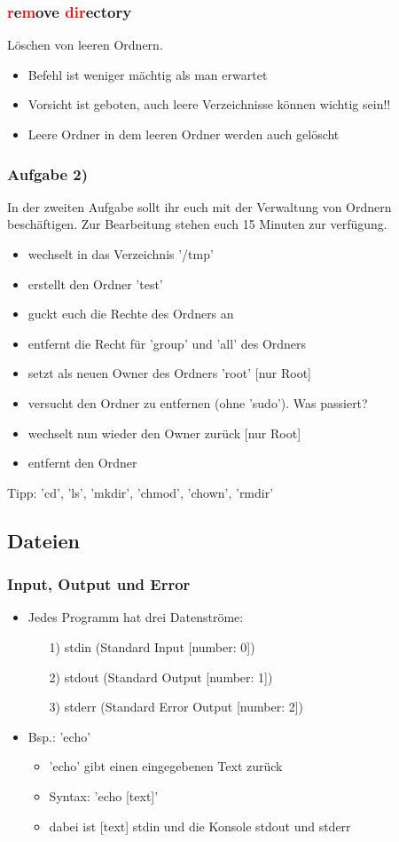 \documentclass[12pt,utf8, handout]{beamer}
\begin{document}
\begin{frame}
\frametitle{\textcolor{red}{r}e\textcolor{red}{m}ove \textcolor{red}{dir}ectory}
Löschen von leeren Ordnern.
\begin{itemize}
	\item Befehl ist weniger mächtig als man erwartet
	\item Vorsicht ist geboten, auch leere Verzeichnisse können wichtig sein!!
	\item Leere Ordner in dem leeren Ordner werden auch gelöscht
\end{itemize}
\end{frame}

\begin{frame}
\frametitle{Aufgabe 2)}
In der zweiten Aufgabe sollt ihr euch mit der Verwaltung von Ordnern beschäftigen. Zur Bearbeitung stehen euch 15 Minuten zur verfügung.
{\footnotesize
\begin{itemize}
	\item wechselt in das Verzeichnis '/tmp'
	\item erstellt den Ordner 'test'
	\item guckt euch die Rechte des Ordners an
	\item entfernt die Recht für 'group' und 'all' des Ordners
	\item setzt als neuen Owner des Ordners 'root' [nur Root]
	\item versucht den Ordner zu entfernen (ohne 'sudo'). Was passiert?
	\item wechselt nun wieder den Owner zurück [nur Root]
	\item entfernt den Ordner
\end{itemize}
}
{\scriptsize Tipp: 'cd', 'ls', 'mkdir', 'chmod', 'chown', 'rmdir'}
\end{frame}

\subsection{Dateien}
\begin{frame}
\frametitle{Input, Output und Error}
\begin{itemize}
	\item Jedes Programm hat drei Datenströme:
	\begin{itemize}
		\item[1)] stdin (Standard Input [number: 0])
		\item[2)] stdout (Standard Output [number: 1])
		\item[3)] stderr (Standard Error Output [number: 2])
	\end{itemize}
	\item Bsp.: 'echo'
	\begin{itemize}[<+->]
		\item 'echo' gibt einen eingegebenen Text zurück
		\item Syntax: 'echo [text]'
		\item dabei ist [text] stdin und die Konsole stdout und stderr
	\end{itemize}
\end{itemize}
\end{frame}
\end{document}
